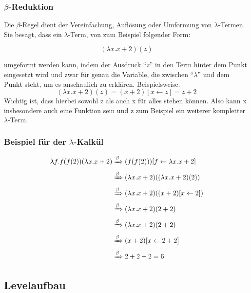 \documentclass{scrartcl}
\begin{document}
\subsubsection{\texorpdfstring{$\beta$}{Beta}-Reduktion}

Die $\beta$-Regel dient der Vereinfachung, Auflösung oder Umformung von $\lambda$-Termen.\\
Sie besagt, dass ein $\lambda$-Term, von zum Beispiel folgender Form:

\[
	(\lambda x.x+2)(z)
\]

umgeformt werden kann, indem der Ausdruck \enquote{$z$} in den Term hinter dem Punkt eingesetzt wird und zwar für genau die Variable, die zwischen \enquote{$\lambda$} und dem Punkt steht, um es anschaulich zu erklären. Beispielsweise:
\[
	(\lambda x.x+2)(z) = (x+2)[x \leftarrow z] = z + 2
\]
Wichtig ist, dass hierbei sowohl z als auch x für alles stehen können. Also kann x insbesondere auch eine Funktion sein und z zum Beispiel ein weiterer kompletter $\lambda$-Term.

\subsubsection{Beispiel für der \texorpdfstring{$\lambda$}{Lambda}-Kalkül}
\[
	\begin{aligned}
		\lambda f.f(f(2))(\lambda x.x+2)&\xRightarrow{\beta} (f(f(2)))[f \leftarrow \lambda x.x+2] \\
		&\xRightarrow{\beta} (\lambda x.x+2)((\lambda x.x+2)(2)) \\
		&\xRightarrow{\beta} (\lambda x.x+2)((x+2)[x \leftarrow 2]) \\
		&\xRightarrow{\beta} (\lambda x.x+2)(2 + 2) \\
		&\xRightarrow{\beta} (\lambda x.x+2)(2 + 2) \\
		&\xRightarrow{\beta} (x+2)[x \leftarrow 2 + 2] \\
		&\xRightarrow{\beta} 2 + 2 + 2 = 6
	\end{aligned}
\]



\subsection{Levelaufbau}  \label{subsection:Levelaufbau}
\end{document}
